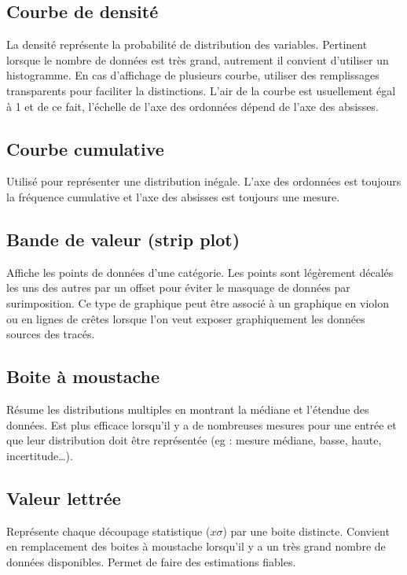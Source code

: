 \documentclass[a4paper,12pt]{article}
\begin{document}
\begin{multicols}{2}
\subsection*{Courbe de densité}
\label{sec:org10759a4}
La densité représente la probabilité de distribution des variables. \autocite{sosulskiGraphics2019} Pertinent lorsque le nombre de données est très grand, autrement il convient d'utiliser un histogramme. \autocite{wilkeVisualizingManyDistributions2019} En cas d'affichage de plusieurs courbe, utiliser  des remplissages transparents pour faciliter la distinctions. L'air de la courbe est usuellement égal à 1 et de ce fait, l'échelle de l'axe des ordonnées dépend de l'axe des absisses. \autocite{wilkeVisualizingManyDistributions2019}
\subsection*{Courbe cumulative}
\label{sec:orgdc33f95}
Utilisé pour représenter une distribution inégale. L'axe des ordonnées est toujours la fréquence cumulative et l'axe des absisses est toujours une mesure. \autocite{alansmithLexiqueVisuel}
\subsection*{Bande de valeur (strip plot)}
\label{sec:orgc922ebb}
Affiche les points de données d'une catégorie. Les points sont légèrement décalés les uns des autres par un offset pour éviter le masquage de données par surimposition. Ce type de graphique peut être associé à un graphique en violon ou en lignes de crêtes lorsque l'on veut exposer graphiquement les données sources des tracés. \autocite{wilkeVisualizingManyDistributions2019}
\subsection*{Boite à moustache}
\label{sec:orgd350e78}
Résume les distributions multiples en montrant la médiane et l'étendue des données. \autocite{alansmithLexiqueVisuel}
Est plus efficace lorsqu'il y a de nombreuses mesures pour une entrée et que leur distribution doit être représentée (eg : mesure médiane, basse, haute, incertitude\ldots{}). \autocite{mikeyiHowChooseRight2020}
\subsection*{Valeur lettrée}
\label{sec:org12a7438}
Représente chaque découpage statistique (\(x\sigma\)) par une boite distincte. Convient en remplacement des boites à moustache lorsqu'il y a un très grand nombre de données disponibles. Permet de faire des estimations fiables. \autocite{hofmannLettervaluePlotsBoxplots2017,mikeyiHowChooseRight2020}

\end{multicols}
\end{document}

